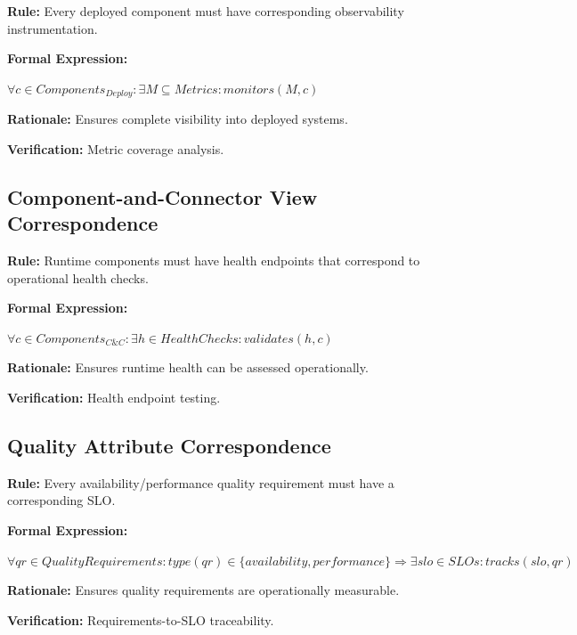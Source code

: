\documentclass[11pt,letterpaper]{article}
\begin{document}
\begin{definitionbox}
\textbf{Rule:} Every deployed component must have corresponding observability instrumentation.

\textbf{Formal Expression:}
\begin{center}
$\forall c \in Components_{Deploy} : \exists M \subseteq Metrics : monitors(M, c)$
\end{center}

\textbf{Rationale:} Ensures complete visibility into deployed systems.

\textbf{Verification:} Metric coverage analysis.
\end{definitionbox}

\subsection{Component-and-Connector View Correspondence}

\begin{definitionbox}
\textbf{Rule:} Runtime components must have health endpoints that correspond to operational health checks.

\textbf{Formal Expression:}
\begin{center}
$\forall c \in Components_{C\&C} : \exists h \in HealthChecks : validates(h, c)$
\end{center}

\textbf{Rationale:} Ensures runtime health can be assessed operationally.

\textbf{Verification:} Health endpoint testing.
\end{definitionbox}

\subsection{Quality Attribute Correspondence}

\begin{definitionbox}
\textbf{Rule:} Every availability/performance quality requirement must have a corresponding SLO.

\textbf{Formal Expression:}
\begin{center}
$\forall qr \in QualityRequirements : type(qr) \in \{availability, performance\} \Rightarrow \exists slo \in SLOs : tracks(slo, qr)$
\end{center}

\textbf{Rationale:} Ensures quality requirements are operationally measurable.

\textbf{Verification:} Requirements-to-SLO traceability.
\end{definitionbox}
\end{document}
